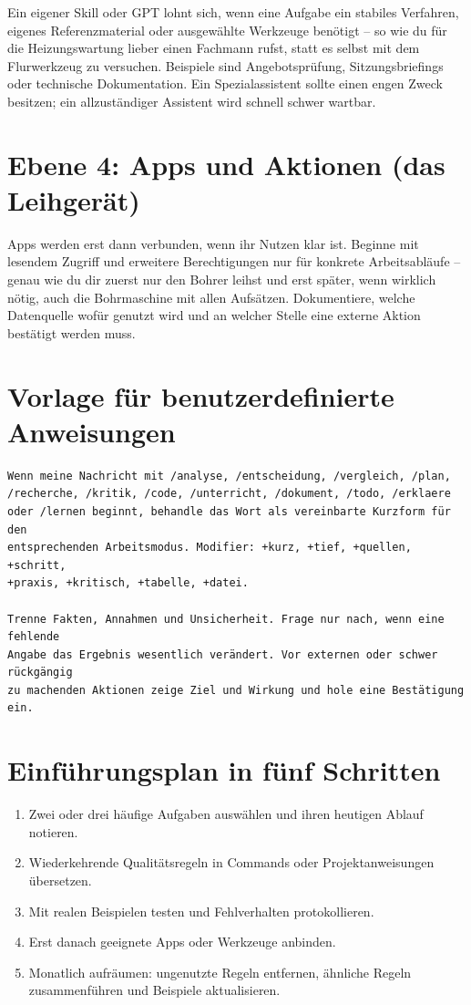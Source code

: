 Ein eigener Skill oder GPT lohnt sich, wenn eine Aufgabe ein stabiles Verfahren, eigenes Referenzmaterial oder ausgewählte Werkzeuge benötigt -- so wie du für die Heizungswartung lieber einen Fachmann rufst, statt es selbst mit dem Flurwerkzeug zu versuchen. Beispiele sind Angebotsprüfung, Sitzungsbriefings oder technische Dokumentation. Ein Spezialassistent sollte einen engen Zweck besitzen; ein allzuständiger Assistent wird schnell schwer wartbar.

\section{Ebene 4: Apps und Aktionen (das Leihgerät)}

Apps werden erst dann verbunden, wenn ihr Nutzen klar ist. Beginne mit lesendem Zugriff und erweitere Berechtigungen nur für konkrete Arbeitsabläufe -- genau wie du dir zuerst nur den Bohrer leihst und erst später, wenn wirklich nötig, auch die Bohrmaschine mit allen Aufsätzen. Dokumentiere, welche Datenquelle wofür genutzt wird und an welcher Stelle eine externe Aktion bestätigt werden muss.

\section{Vorlage für benutzerdefinierte Anweisungen}

\begin{lstlisting}
Wenn meine Nachricht mit /analyse, /entscheidung, /vergleich, /plan,
/recherche, /kritik, /code, /unterricht, /dokument, /todo, /erklaere
oder /lernen beginnt, behandle das Wort als vereinbarte Kurzform für den
entsprechenden Arbeitsmodus. Modifier: +kurz, +tief, +quellen, +schritt,
+praxis, +kritisch, +tabelle, +datei.

Trenne Fakten, Annahmen und Unsicherheit. Frage nur nach, wenn eine fehlende
Angabe das Ergebnis wesentlich verändert. Vor externen oder schwer rückgängig
zu machenden Aktionen zeige Ziel und Wirkung und hole eine Bestätigung ein.
\end{lstlisting}

\section{Einführungsplan in fünf Schritten}

\begin{enumerate}
\item Zwei oder drei häufige Aufgaben auswählen und ihren heutigen Ablauf notieren.
\item Wiederkehrende Qualitätsregeln in Commands oder Projektanweisungen übersetzen.
\item Mit realen Beispielen testen und Fehlverhalten protokollieren.
\item Erst danach geeignete Apps oder Werkzeuge anbinden.
\item Monatlich aufräumen: ungenutzte Regeln entfernen, ähnliche Regeln zusammenführen und Beispiele aktualisieren.
\end{enumerate}

